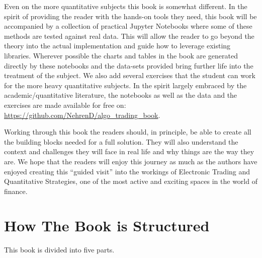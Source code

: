 Even on the more quantitative subjects this book is somewhat different. In the spirit of providing the reader with the hands-on tools they need, this book will be accompanied by a collection of practical Jupyter Notebooks where some of these methods are tested against real data. This will allow the reader to go beyond the theory into the actual implementation and guide how to leverage existing libraries. Wherever possible the charts and tables in the book are generated directly by these notebooks and the data-sets provided bring further life into the treatment of the subject. We also add several exercises that the student can work for the more heavy quantitative subjects. In the spirit largely embraced by the academic/quantitative literature, the notebooks as well as the data and the exercises are made  available for free on: \url{https://github.com/NehrenD/algo_trading_book}.

Working through this book the readers should, in principle, be able to create all the building blocks needed for a full solution. They will also understand the context and challenges they will face in real life and why things are the way they are. We hope that the readers will enjoy this journey as much as the authors have enjoyed creating this ``guided visit'' into the workings of Electronic Trading and Quantitative Strategies, one of the most active and exciting spaces in the world of finance.

\section{How The Book is Structured}

This book is divided into five parts. 

